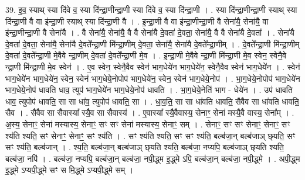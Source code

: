 \documentclass[17pt]{extarticle}
\begin{document}
39. इ॒व॒ स्याथ् स्या दि॑वे व॒ स्या दि॑न्द्रा॒णीन्द्रा॒णी स्या दि॑वे व॒ स्या दि॑न्द्रा॒णी । . स्या दि॑न्द्रा॒णीन्द्रा॒णी स्याथ् स्या दि॑न्द्रा॒णी वै वा इ॑न्द्रा॒णी स्याथ् स्या दि॑न्द्रा॒णी वै । . इ॒न्द्रा॒णी वै वा इ॑न्द्रा॒णीन्द्रा॒णी वै सेना॑यै॒ सेना॑यै॒ वा इ॑न्द्रा॒णीन्द्रा॒णी वै सेना॑यै । . वै सेना॑यै॒ सेना॑यै॒ वै वै सेना॑यै दे॒वता॑ दे॒वता॒ सेना॑यै॒ वै वै सेना॑यै दे॒वता᳚ । . सेना॑यै दे॒वता॑ दे॒वता॒ सेना॑यै॒ सेना॑यै दे॒वते᳚न्द्रा॒णी मि॑न्द्रा॒णीम् दे॒वता॒ सेना॑यै॒ सेना॑यै दे॒वते᳚न्द्रा॒णीम् । . दे॒वते᳚न्द्रा॒णी मि॑न्द्रा॒णीम् दे॒वता॑ दे॒वते᳚न्द्रा॒णी मे॒वैवे न्द्रा॒णीम् दे॒वता॑ दे॒वते᳚न्द्रा॒णी मे॒व । . इ॒न्द्रा॒णी मे॒वैवे न्द्रा॒णी मि॑न्द्रा॒णी मे॒व स्वेन॒ स्वेनै॒वे न्द्रा॒णी मि॑न्द्रा॒णी मे॒व स्वेन॑ । . ए॒व स्वेन॒ स्वेनै॒वैव स्वेन॑ भाग॒धेये॑न भाग॒धेये॑न॒ स्वेनै॒वैव स्वेन॑ भाग॒धेये॑न । . स्वेन॑ भाग॒धेये॑न भाग॒धेये॑न॒ स्वेन॒ स्वेन॑ भाग॒धेये॒नोपोप॑ भाग॒धेये॑न॒ स्वेन॒ स्वेन॑ भाग॒धेये॒नोप॑ । . भा॒ग॒धेये॒नोपोप॑ भाग॒धेये॑न भाग॒धेये॒नोप॑ धावति धाव॒ त्युप॑ भाग॒धेये॑न भाग॒धेये॒नोप॑ धावति । . भा॒ग॒धेये॒नेति॑ भाग - धेये॑न । . उप॑ धावति धाव॒ त्युपोप॑ धावति॒ सा सा धा॑व॒ त्युपोप॑ धावति॒ सा । . धा॒व॒ति॒ सा सा धा॑वति धावति॒ सैवैव सा धा॑वति धावति॒ सैव । . सैवैव सा सैवास्या᳚ स्यै॒व सा सैवास्य॑ । . ए॒वास्या᳚ स्यै॒वैवास्य॒ सेनाꣳ॒॒ सेना॑ मस्यै॒वै वास्य॒ सेना᳚म् । . अ॒स्य॒ सेनाꣳ॒॒ सेना॑ मस्यास्य॒ सेनाꣳ॒॒ सꣳ सꣳ सेना॑ मस्यास्य॒ सेनाꣳ॒॒ सम् । . सेनाꣳ॒॒ सꣳ सꣳ सेनाꣳ॒॒ सेनाꣳ॒॒ सꣳ श्य॑ति श्यति॒ सꣳ सेनाꣳ॒॒ सेनाꣳ॒॒ सꣳ श्य॑ति । . सꣳ श्य॑ति श्यति॒ सꣳ सꣳ श्य॑ति॒ बल्ब॑जा॒न् बल्ब॑जाञ् छ्‌यति॒ सꣳ सꣳ श्य॑ति॒ बल्ब॑जान् । . श्य॒ति॒ बल्ब॑जा॒न् बल्ब॑जाञ् छ्‌यति श्यति॒ बल्ब॑जा॒ नप्यपि॒ बल्ब॑जाञ् छ्‌यति श्यति॒ बल्ब॑जा॒ नपि॑ । . बल्ब॑जा॒ नप्यपि॒ बल्ब॑जा॒न् बल्ब॑जा॒ नपी॒द्ध्म इ॒द्ध्मे ऽपि॒ बल्ब॑जा॒न् बल्ब॑जा॒ नपी॒द्ध्मे । . अपी॒द्ध्म इ॒द्ध्मे ऽप्यपी॒द्ध्मे सꣳ स मि॒द्ध्मे ऽप्यपी॒द्ध्मे सम् । \newline
\pagebreak
{}
\end{document}
